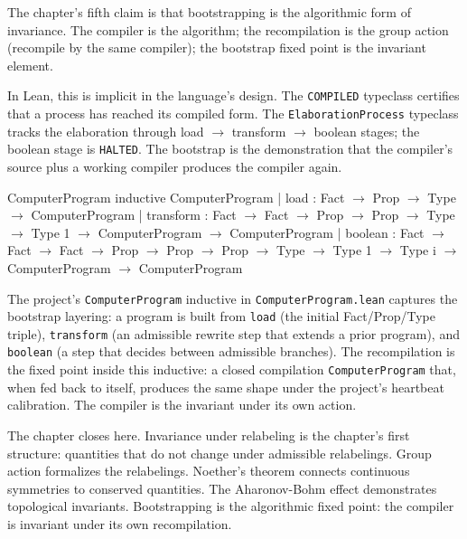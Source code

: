 The chapter's fifth claim is that bootstrapping is the
algorithmic form of invariance. The compiler is the algorithm; the
recompilation is the group action (recompile by the same compiler);
the bootstrap fixed point is the invariant element.

In Lean, this is implicit in the language's design. The
\texttt{COMPILED} typeclass certifies that a process has reached
its compiled form. The
\texttt{ElaborationProcess} typeclass tracks the elaboration
through load $\to$ transform $\to$ boolean stages; the boolean
stage is \texttt{HALTED}. The bootstrap is the demonstration that
the compiler's source plus a working compiler produces the
compiler again.

\begin{leanexcerpt}{ComputerProgram}
inductive ComputerProgram
  | load      : Fact $\to$ Prop $\to$ Type $\to$ ComputerProgram
  | transform : Fact $\to$ Fact $\to$ Prop $\to$ Prop
              $\to$ Type $\to$ Type 1
              $\to$ ComputerProgram $\to$ ComputerProgram
  | boolean   : Fact $\to$ Fact $\to$ Fact $\to$ Prop $\to$ Prop $\to$ Prop
              $\to$ Type $\to$ Type 1 $\to$ Type i
              $\to$ ComputerProgram $\to$ ComputerProgram
\end{leanexcerpt}

The project's \texttt{ComputerProgram} inductive in
\texttt{ComputerProgram.lean} captures the bootstrap layering: a
program is built from \texttt{load} (the initial Fact/Prop/Type
triple), \texttt{transform} (an admissible rewrite step that
extends a prior program), and \texttt{boolean} (a step that
decides between admissible branches). The recompilation is the
fixed point inside this inductive: a closed compilation
\texttt{ComputerProgram} that, when fed back to itself, produces
the same shape under the project's heartbeat calibration. The
compiler is the invariant under its own action.

The chapter closes here. Invariance under relabeling is the
chapter's first structure: quantities that do not change under
admissible relabelings. Group action formalizes the relabelings.
Noether's theorem connects continuous symmetries to conserved
quantities. The Aharonov-Bohm effect demonstrates topological
invariants. Bootstrapping is the algorithmic fixed point: the
compiler is invariant under its own recompilation.

